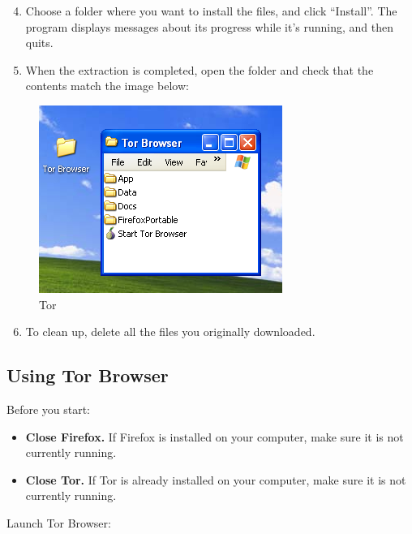 \begin{enumerate}[1.]
\setcounter{enumi}{3}
\item
  Choose a folder where you want to install the files, and click
  ``Install''. The program displays messages about its progress while
  it's running, and then quits.
\item
  When the extraction is completed, open the folder and check that the
  contents match the image below:
\end{enumerate}
\begin{figure}[htbp]
\centering
\includegraphics{tor_6.png}
\caption{Tor}
\end{figure}

\begin{enumerate}[1.]
\setcounter{enumi}{5}
\item
  To clean up, delete all the files you originally downloaded.
\end{enumerate}
\subsection{Using Tor Browser}

Before you start:

\begin{itemize}
\item
  \textbf{Close Firefox.} If Firefox is installed on your computer, make
  sure it is not currently running.
\item
  \textbf{Close Tor.} If Tor is already installed on your computer, make
  sure it is not currently running.
\end{itemize}
Launch Tor Browser:

